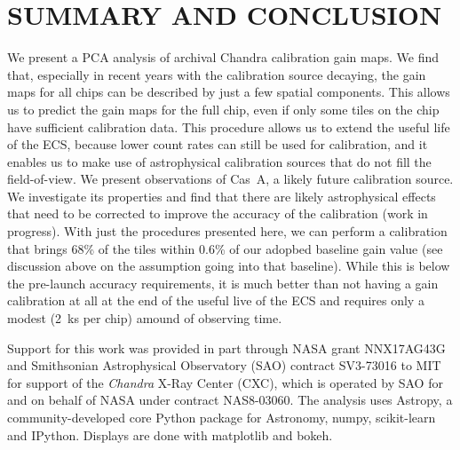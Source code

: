 \documentclass[]{spie}  %
\begin{document}
\section{SUMMARY AND CONCLUSION}
We present a PCA analysis of archival Chandra calibration gain maps. We find that, especially in recent years with the calibration source decaying, the gain maps for all chips can be described by just a few spatial components. This allows us to predict the gain maps for the full chip, even if only some tiles on the chip have sufficient calibration data. This procedure allows us to extend the useful life of the ECS, because lower count rates can still be used for calibration, and it enables us to make use of astrophysical calibration sources that do not fill the field-of-view. We present observations of Cas~A, a likely future calibration source. We investigate its properties and find that there are likely astrophysical effects that need to be corrected to improve the accuracy of the calibration (work in progress). With just the procedures presented here, we can perform a calibration that brings 68\% of the tiles within 0.6\% of our adopbed baseline gain value (see discussion above on the assumption going into that baseline). While this is below the pre-launch accuracy requirements, it is much better than not having a gain calibration at all at the end of the useful live of the ECS and requires only a modest (2~ks per chip) amound of observing time.

\acknowledgments
Support
for this work was provided in part through NASA grant NNX17AG43G and
Smithsonian Astrophysical Observatory (SAO) contract SV3-73016 to MIT
for support of the {\em Chandra} X-Ray Center (CXC), which is operated
by SAO for and on behalf of NASA under contract NAS8-03060.
The
analysis uses Astropy, a community-developed core Python
package for Astronomy\cite{astropy1,astropy2}, numpy\cite{numpy}, scikit-learn\cite{scikit-learn} and
IPython\cite{IPython}. Displays are done with
matplotlib\cite{matplotlib} and bokeh\cite{bokeh}.

\end{document}
